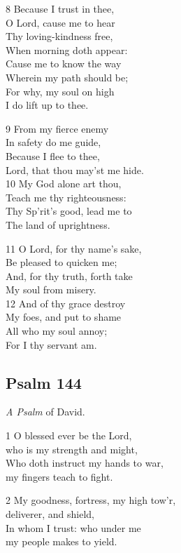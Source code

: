 8 Because I trust in thee,\\
O Lord, cause me to hear\\
Thy loving-kindness free,\\
When morning doth appear:\\
Cause me to know the way\\
Wherein my path should be;\\
For why, my soul on high\\
I do lift up to thee.

9 From my fierce enemy\\
In safety do me guide,\\
Because I flee to thee,\\
Lord, that thou may’st me hide.\\
10 My God alone art thou,\\
Teach me thy righteousness:\\
Thy Sp’rit’s good, lead me to\\
The land of uprightness.

11 O Lord, for thy name’s sake,\\
Be pleased to quicken me;\\
And, for thy truth, forth take\\
My soul from misery.\\
12 And of thy grace destroy\\
My foes, and put to shame\\
All who my soul annoy;\\
For I thy servant am.

\begin{center}
\quad{}\quad{}
\end{center}

\subsection*{Psalm 144}

\emph{A Psalm} of David.

1 O blessed ever be the Lord,\\
who is my strength and might,\\
Who doth instruct my hands to war,\\
my fingers teach to fight.

2 My goodness, fortress, my high tow’r,\\
deliverer, and shield,\\
In whom I trust: who under me\\
my people makes to yield.

